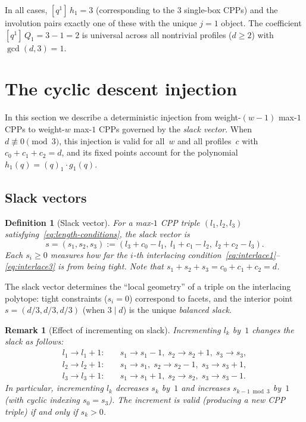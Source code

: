 \documentclass[11pt]{article}
\newtheorem{definition}[theorem]{Definition}
\newtheorem{remark}[theorem]{Remark}
\begin{document}
In all cases, $[q^1]\,h_1 = 3$ (corresponding to the 3 single-box CPPs) and the
involution pairs exactly one of these with the unique $j=1$ object.
The coefficient $[q^1]\,Q_1 = 3 - 1 = 2$ is universal across all nontrivial
profiles ($d \geq 2$) with $\gcd(d, 3) = 1$.


\section{The cyclic descent injection}
\label{sec:cyclic-descent}

In this section we describe a deterministic injection from weight-$(w{-}1)$
max-$1$ CPPs to weight-$w$ max-$1$ CPPs governed by the \emph{slack vector}.
When $d \not\equiv 0 \pmod{3}$, this injection is valid for all~$w$ and all
profiles~$c$ with $c_0 + c_1 + c_2 = d$, and its fixed points account for the
polynomial $h_1(q) = (q)_1 \cdot g_1(q)$.

\subsection{Slack vectors}

\begin{definition}[Slack vector]
For a max-$1$ CPP triple $(l_1, l_2, l_3)$ satisfying~\eqref{eq:length-conditions},
the \emph{slack vector} is
\begin{equation}
  s = (s_1, s_2, s_3) := (l_3 + c_0 - l_1,\; l_1 + c_1 - l_2,\; l_2 + c_2 - l_3).
  \label{eq:slack-def}
\end{equation}
Each $s_i \geq 0$ measures how far the $i$-th interlacing
condition~\eqref{eq:interlace1}--\eqref{eq:interlace3} is from being tight.
Note that $s_1 + s_2 + s_3 = c_0 + c_1 + c_2 = d$.
\end{definition}

The slack vector determines the ``local geometry'' of a triple on the
interlacing polytope: tight constraints ($s_i = 0$) correspond to facets,
and the interior point $s = (d/3, d/3, d/3)$ (when $3 \mid d$) is the unique
\emph{balanced slack}.

\begin{remark}[Effect of incrementing on slack]
\label{rem:slack-effect}
Incrementing $l_k$ by~$1$ changes the slack as follows:
\begin{align*}
  l_1 \to l_1 + 1\colon &\quad s_1 \to s_1 - 1,\; s_2 \to s_2 + 1,\; s_3 \to s_3, \\
  l_2 \to l_2 + 1\colon &\quad s_1 \to s_1,\; s_2 \to s_2 - 1,\; s_3 \to s_3 + 1, \\
  l_3 \to l_3 + 1\colon &\quad s_1 \to s_1 + 1,\; s_2 \to s_2,\; s_3 \to s_3 - 1.
\end{align*}
In particular, incrementing $l_k$ decreases $s_k$ by~$1$ and increases
$s_{k-1 \bmod 3}$ by~$1$ (with cyclic indexing $s_0 = s_3$).
The increment is valid (producing a new CPP triple) if and only if $s_k > 0$.
\end{remark}
\end{document}
